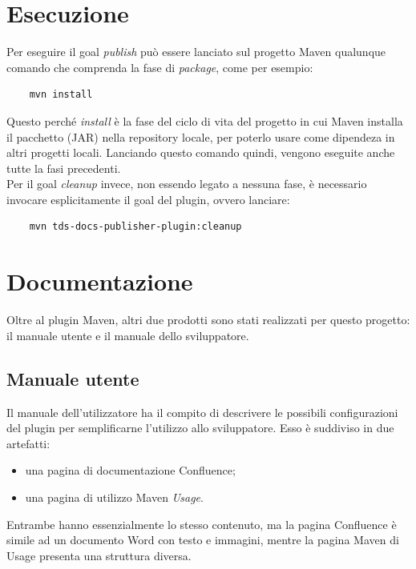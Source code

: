\clearpage

\section{Esecuzione}    \label{secEsecuzione}
Per eseguire il goal \emph{publish} può essere lanciato sul progetto Maven qualunque comando che comprenda la fase di \emph{package}, come per esempio:
\begin{lstlisting} 
    mvn install
\end{lstlisting}
Questo perché \emph{install} è la fase del ciclo di vita del progetto in cui Maven installa il pacchetto (JAR) nella repository locale, per poterlo usare come dipendeza in altri progetti locali.
Lanciando questo comando quindi, vengono eseguite anche tutte la fasi precedenti.\\

Per il goal \emph{cleanup} invece, non essendo legato a nessuna fase, è necessario invocare esplicitamente il goal del plugin, ovvero lanciare:
\begin{lstlisting} 
    mvn tds-docs-publisher-plugin:cleanup
\end{lstlisting}

\clearpage

\section{Documentazione}    \label{secDocumentazione}
Oltre al plugin Maven, altri due prodotti sono stati realizzati per questo progetto: il manuale utente e il manuale dello sviluppatore.

    \subsection{Manuale utente}
    Il manuale dell'utilizzatore ha il compito di descrivere le possibili configurazioni del plugin per semplificarne l'utilizzo allo sviluppatore.
    Esso è suddiviso in due artefatti:
    \begin{itemize}
        \item una pagina di documentazione Confluence;
        \item una pagina di utilizzo Maven \emph{Usage}.
    \end{itemize}
    Entrambe hanno essenzialmente lo stesso contenuto, ma la pagina Confluence è simile ad un documento Word con testo e immagini, mentre la pagina Maven di Usage presenta una struttura diversa.

